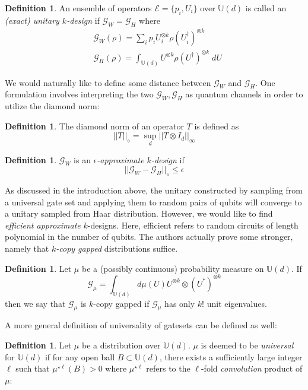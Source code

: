\documentclass[12pt]{amsart}
\theoremstyle{definition}
\newtheorem{definition}[theorem]{Definition}
\theoremstyle{remark}
\numberwithin{equation}{section}
\theoremstyle{remark}
\begin{document}
\begin{definition}
  An ensemble of operators $\mathcal{E} = \{p_i, U_i\}$ over $\mathbb{U}(d)$ is called an \emph{(exact) unitary $k$-design} if $\mathcal{G}_W = \mathcal{G}_H$ where
  \begin{align}
    & \mathcal{G}_W(\rho) = \sum_{i} p_i U_i^{\otimes k}\rho (U_i^{\dagger})^{\otimes k} \\
    & \mathcal{G}_H(\rho) = \int_{\mathbb{U}(d)} U^{\otimes k} \rho (U^\dagger)^{\otimes k} \; dU
  \end{align}
\end{definition}
%
 We would naturally like to define some distance between $\mathcal{G}_W$ and $\mathcal{G}_H$. One formulation involves interpreting the two $\mathcal{G}_W, \mathcal{G}_H$ as quantum channels in order to utilize the diamond norm:
%
\begin{definition}
  The diamond norm of an operator $T$ is defined as
  $$||T||_{\diamond} = \sup_d ||T \otimes I_d ||_{\infty} $$
\end{definition}
%
\begin{definition}
  $\mathcal{G}_W$ is an \emph{$\epsilon$-approximate $k$-design} if
  \begin{equation}
    ||\mathcal{G}_W - \mathcal{G}_H ||_{\diamond}  \leq \epsilon
  \end{equation}
\end{definition}
%
As discussed in the introduction above, the unitary constructed by sampling from a universal gate set and applying them to random pairs of qubits will converge to a unitary sampled from Haar distribution. However, we would like to find \emph{efficient approximate} $k$-designs. Here, efficient refers to random circuits of length polynomial in the number of qubits. The authors actually prove some stronger, namely that \emph{$k$-copy gapped} distributions suffice.
%
\begin{definition}
  Let $\mu$ be a (possibly continuous) probability measure on $\mathbb{U}(d)$. If
  \begin{equation}
    \mathcal{G}_{\mu} = \int_{\mathbb{U}(d)} d\mu(U) U^{\otimes k} \otimes (U^*)^{\otimes k}
  \end{equation}
  then we say that $\mathcal{G}_\mu$ is $k$-copy gapped if $\mathcal{G}_\mu$ has only $k!$ unit eigenvalues.
\end{definition}
%
\noindent A more general definition of universality of gatesets can be defined as well:
%
\begin{definition}
  Let $\mu$ be a distribution over $\mathbb{U}(d)$. $\mu$ is deemed to be \emph{universal} for $\mathbb{U}(d)$ if for any open ball $B \subset \mathbb{U}(d)$, there exists a sufficiently large integer $\ell$ such that $\mu^{\star \ell}(B) > 0$
  where $\mu^{\star \ell}$ refers to the $\ell$-fold \emph{convolution} product of $\mu$:
\end{definition}
\end{document}
